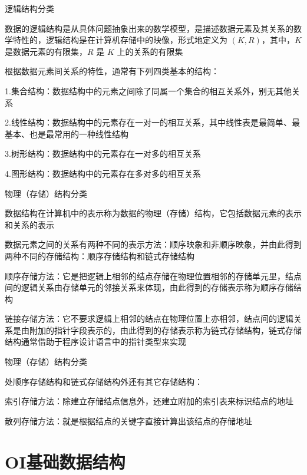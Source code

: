 \documentclass[UTF8]{beamer}
\begin{document}
			\begin{frame}{逻辑结构分类}

			数据的逻辑结构是从具体问题抽象出来的数学模型，是描述数据元素及其关系的数学特性的，逻辑结构是在计算机存储中的映像，形式地定义为 $(K,R)$，其中，$K$ 是数据元素的有限集，$R$ 是 $K$ 上的关系的有限集

			根据数据元素间关系的特性，通常有下列四类基本的结构：

			1.集合结构：数据结构中的元素之间除了同属一个集合的相互关系外，别无其他关系

			2.线性结构：数据结构中的元素存在一对一的相互关系，其中线性表是最简单、最基本、也是最常用的一种线性结构

			3.树形结构：数据结构中的元素存在一对多的相互关系

			4.图形结构：数据结构中的元素存在多对多的相互关系

			\end{frame}

			\begin{frame}{物理（存储）结构分类}

			数据结构在计算机中的表示称为数据的物理（存储）结构，它包括数据元素的表示和关系的表示

			数据元素之间的关系有两种不同的表示方法：顺序映象和非顺序映象，并由此得到两种不同的存储结构：顺序存储结构和链式存储结构

			顺序存储方法：它是把逻辑上相邻的结点存储在物理位置相邻的存储单元里，结点间的逻辑关系由存储单元的邻接关系来体现，由此得到的存储表示称为顺序存储结构

			链接存储方法：它不要求逻辑上相邻的结点在物理位置上亦相邻，结点间的逻辑关系是由附加的指针字段表示的，由此得到的存储表示称为链式存储结构，链式存储结构通常借助于程序设计语言中的指针类型来实现

			\end{frame}

			\begin{frame}{物理（存储）结构分类}

			处顺序存储结构和链式存储结构外还有其它存储结构：

			索引存储方法：除建立存储结点信息外，还建立附加的索引表来标识结点的地址

			散列存储方法：就是根据结点的关键字直接计算出该结点的存储地址

			\end{frame}

	\section{OI基础数据结构}
\end{document}
